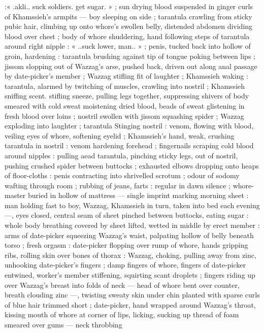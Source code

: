 :« .akli.. suck soldiers. get sugar. » ; sun drying blood suspended
in ginger curls of Khamssieh's armpits --- boy sleeping on side ;
tarantula crawling from sticky pubic hair, climbing up onto whore's
swollen belly, distended abdomen dividing blood over chest ; body of
whore shuddering, hand following steps of tarantula around right
nipple : « ..suck lower, man.. » ; penis, tucked back into hollow of
groin, hardening : tarantula brushing against tip of tongue poking
between lips ; jissom slopping out of Wazzag's arse, pushed back,
driven out along anal passage by date-picker's member ; Wazzag
stifling fit of laughter ; Khamssieh waking : tarantula, alarmed by
twitching of muscles, crawling into nostril ; Khamssieh sniffing scent.
stifling sneeze, pulling legs together, suppressing shivers of body
smeared with cold sweat moistening dried blood, beads of sweat
glistening in fresh blood over loins ; nostril swollen with jissom
squashing spider ; Wazzag exploding into laughter ; tarantula
Stinging nostril : venom, flowing with blood, veiling eyes of whore,
softening eyelid ; Khamssieh's hand, weak, crushing tarantula in
nostril : venom hardening forehead ; fingernails scraping cold blood
around nipples : pulling aead tarantula, pinching sticky legs, out of
nostril, pushing crushed spider between buttocks ; exhausted elbows
dropping onto heaps of floor-cloths : penis contracting into
shrivelled scrotum ; odour of sodomy wafting through room ; rubbing
of jeans, farts : regular in dawn silence ; whore-master buried in
hollow of mattress --- single imprint marking morning sheet : man
holding fast to boy, Wazzag, Khamssieh in turn, taken into bed each
evening ---, eyes closed, central seam of sheet pinched between
buttocks, eating sugar : whole body breathing covered by sheet
lifted, wetted in middle by erect member : arms of date-picker
squeezing Wazzag's waist, palpating hollow of belly beneath torso ;
fresh orgasm : date-picker flopping over rump of whore, hands
gripping ribs, rolling skin over bones of thorax : Wazzag, choking,
pulling away from zinc, unhooking date-picker's fingers ; damp
fingers of whore, fingers of date-picker entwined, worker's member
stiffening, squirting scant droplets ; fingers riding up over Wazzag's
breast into folds of neck --- head of whore bent over counter, breath
clouding zinc ---, twisting sweaty skin under chin planted with sparse
curls of blue hair trimmed short ; date-picker, hand wrapped around
Wazzag's throat, kissing mouth of whore at corner of lips, licking,
sucking up thread of foam smeared over gums --- neck throbbing
